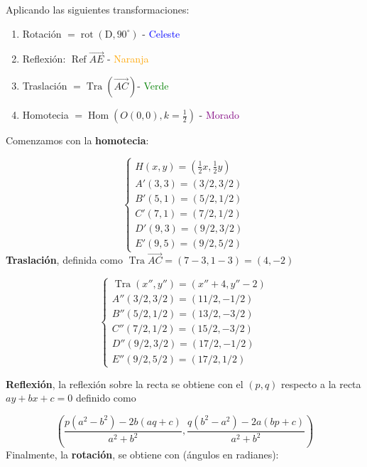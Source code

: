 \begin{sol}
	Aplicando las siguientes transformaciones: 
		\begin{enumerate}
		\item Rotación $=\operatorname{rot}\left(\mathrm{D}, 90^{\circ}\right)$ - \textcolor{blue}{Celeste}
		\item Reflexión: $\operatorname{Ref} \overrightarrow{A E}$ - \textcolor{orange}{Naranja}
		\item Traslación $=\operatorname{Tra}(\overrightarrow{A C})$- \textcolor{green}{Verde}
		\item Homotecia $=\operatorname{Hom}\left(O(0,0), k=\frac{1}{2}\right)$ - \textcolor{purple}{Morado}
	\end{enumerate}

Comenzamos con la \textbf{homotecia}: 

$$\begin{cases}
	H(x,y)= (\frac{1}{2}x,\frac{1}{2}y)\\
	A'(3,3)= (3/2,3/2)\\
	B'(5,1)= (5/2,1/2)\\
	C'(7,1)= (7/2,1/2)\\
	D'(9,3)= (9/2,3/2)\\
	E'(9,5)=(9/2,5/2)
\end{cases}$$
\textbf{Traslación}, definida como $\operatorname{Tra}\overrightarrow{AC}= (7-3,1-3)=(4,-2)$

$$\begin{cases}
	\operatorname{Tra}(x'',y'')= (x''+4,y''-2)\\
	A''(3/2,3/2)= (11/2,-1/2)\\
	B''(5/2,1/2)= (13/2,-3/2)\\
	C''(7/2,1/2)= (15/2,-3/2)\\
	D''(9/2,3/2)= (17/2,-1/2)\\
	E''(9/2,5/2)=(17/2,1/2)
\end{cases}$$

\textbf{Reflexión}, la reflexión sobre la recta se obtiene con el $(p, q)$ respecto a la recta  $ay + bx + c = 0$ definido como

$$\left(\frac{p(a^{2}-b^{2})-2b(aq+c)}{a^{2}+b^{2}},\frac{q(b^{2}-a^{2})-2a(bp+c)}{a^{2}+b^{2}}\right)$$
Finalmente, la \textbf{rotación}, se obtiene con (ángulos en radianes): 


\end{sol}
